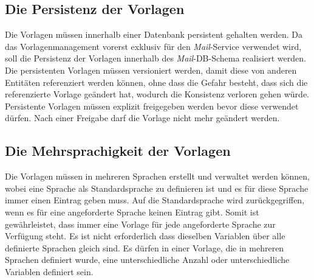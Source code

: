 \subsection{Die Persistenz der Vorlagen}
Die Vorlagen müssen innerhalb einer Datenbank persistent gehalten werden. Da das Vorlagenmanagement vorerst exklusiv für den \emph{Mail}-Service verwendet wird, soll die Persistenz der Vorlagen innerhalb des \emph{Mail}-DB-Schema realisiert werden. Die persistenten Vorlagen müssen versioniert werden, damit diese von anderen Entitäten referenziert werden können, ohne dass die Gefahr besteht, dass sich die referenzierte Vorlage geändert hat, wodurch die Konsistenz verloren gehen würde. Persistente Vorlagen müssen explizit freigegeben werden bevor diese verwendet dürfen. Nach einer Freigabe darf die Vorlage nicht mehr geändert werden.

\subsection{Die Mehrsprachigkeit der Vorlagen}
Die Vorlagen müssen in mehreren Sprachen erstellt und verwaltet werden können, wobei eine Sprache als Standardsprache zu definieren ist und es für diese Sprache immer einen Eintrag geben muss. Auf die Standardsprache wird zurückgegriffen, wenn es für eine angeforderte Sprache keinen Eintrag gibt. Somit ist gewährleistet, dass immer eine Vorlage für jede angeforderte Sprache zur Verfügung steht. Es ist nicht erforderlich dass dieselben Variablen über alle definierte Sprachen gleich sind. Es dürfen in einer Vorlage, die in mehreren Sprachen definiert wurde, eine unterschiedliche Anzahl oder unterschiedliche Variablen definiert sein.


